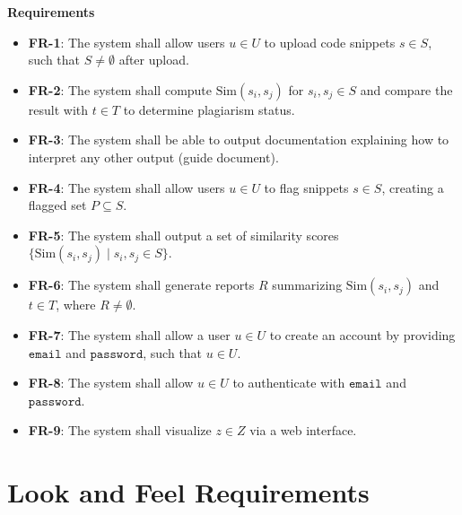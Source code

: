 \documentclass[12pt]{article}
\begin{document}
\textbf{Requirements}
\begin{itemize}
    \item \textbf{FR-1}: The system shall allow users \( u \in U \) to upload code snippets \( s \in S \), such that \( S \neq \emptyset \) after upload.
    \item \textbf{FR-2}: The system shall compute \( \text{Sim}(s_i, s_j) \) for \( s_i, s_j \in S \) and compare the result with \( t \in T \) to determine plagiarism status.
    \item \textbf{FR-3}: The system shall be able to output documentation explaining how to interpret any other output (guide document).
    \item \textbf{FR-4}: The system shall allow users \( u \in U \) to flag snippets \( s \in S \), creating a flagged set \( P \subseteq S \).
    \item \textbf{FR-5}: The system shall output a set of similarity scores \( \{ \text{Sim}(s_i, s_j) \mid s_i, s_j \in S \} \).
    \item \textbf{FR-6}: The system shall generate reports \( R \) summarizing \( \text{Sim}(s_i, s_j) \) and \( t \in T \), where \( R \neq \emptyset \).
    \item \textbf{FR-7}: The system shall allow a user \( u \in U \) to create an account by providing \( \texttt{email} \) and \( \texttt{password} \), such that \( u \in U \).
    \item \textbf{FR-8}: The system shall allow \( u \in U \) to authenticate with \( \texttt{email} \) and \( \texttt{password} \).
    \item \textbf{FR-9}: The system shall visualize \( z \in Z \) via a web interface.
\end{itemize}

\section{Look and Feel Requirements}
\end{document}
